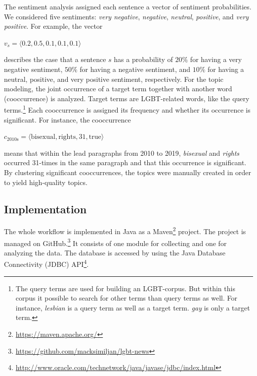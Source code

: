 \documentclass[10pt,a4paper,twocolumn]{scrartcl}
\begin{document}
The sentiment analysis assigned each sentence a vector of sentiment probabilities. We considered five sentiments: \textit{very negative}, \textit{negative}, \textit{neutral}, \textit{positive}, and \textit{very positive}. For example, the vector \begin{center}
$v_s = \langle 0.2, 0.5, 0.1, 0.1, 0.1\rangle$
\end{center} describes the case that a sentence $s$ has a probability of $20\%$ for having a very negative sentiment, $50\%$ for having a negative sentiment, and $10\%$ for having a neutral, positive, and very positive sentiment, respectively. For the topic modeling, the joint occurrence of a target term together with another word (cooccurrence) is analyzed. Target terms are LGBT-related words, like the query terms.\footnote{The query terms are used for building an LGBT-corpus. But within this corpus it possible to search for other terms than query terms as well. For instance, \textit{lesbian} is a query term as well as a target term. \textit{gay} is only a target term.} Each cooccurrence is assigned its frequency and whether its occurrence is significant. For instance, the cooccurrence \begin{center}
$c_\text{2010s} = \langle \text{bisexual}, \text{rights}, 31, \text{true}\rangle$
\end{center} means that within the lead paragraphs from 2010 to 2019, \textit{bisexual} and \textit{rights} occurred 31-times in the same paragraph and that this occurrence is significant. By clustering significant cooccurrences, the topics were manually created in order to yield high-quality topics.

\subsection*{Implementation} The whole workflow is implemented in Java as a Maven\footnote{\url{https://maven.apache.org/}} project. The project is managed on GitHub.\footnote{\url{https://github.com/macksimiljan/lgbt-news}} It consists of one module for collecting and one for analyzing the data. The database is accessed by using the Java Database Connectivity (JDBC) API\footnote{\url{http://www.oracle.com/technetwork/java/javase/jdbc/index.html}}.
\end{document}
